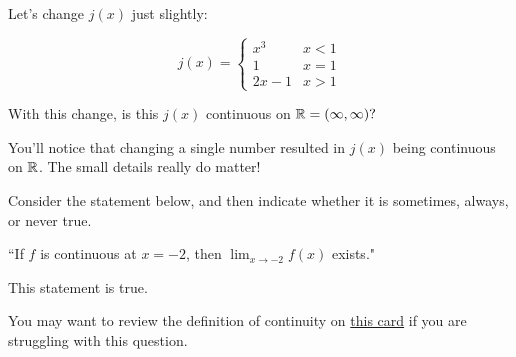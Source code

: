 \documentclass[handout]{ximera}
\begin{document}
\begin{exercise}
\begin{exercise}
\begin{exercise}
\begin{exercise}
\begin{multipleChoice}
\end{multipleChoice}

\begin{exercise}

Let's change $j(x)$ just slightly: 

\[
j(x) = \begin{cases}
  x^3  & x < 1 \\
  1 & x=1 \\ 
  2x-1 & x > 1
\end{cases}
\]

With this change, is this $j(x)$ continuous on $\mathbb R = (\infty, \infty)?$  

\begin{multipleChoice}
    
\begin{feedback}[correct]
You'll notice that changing a single number resulted in $j(x)$ being continuous on $\mathbb R$.  The small details really do matter!   
\end{feedback}

\end{multipleChoice}
\end{exercise}
\end{exercise}
\end{exercise}

\begin{exercise}

Consider the statement below, and then indicate whether it is sometimes, always, or never true.

\begin{center} ``If $f$ is continuous at $x=-2$, then $\displaystyle\lim_{x\to -2} f(x)$ exists." \end{center}

This statement is  true.

\begin{hint}

You may want to review the definition of continuity on \href{https://ximera.osu.edu/math160fa17/m160exam1content/limitLaws/digInContinuity}{this card} if you are struggling with this question. 

\end{hint}


\end{exercise}
\end{exercise}
\end{exercise}
\end{document}

